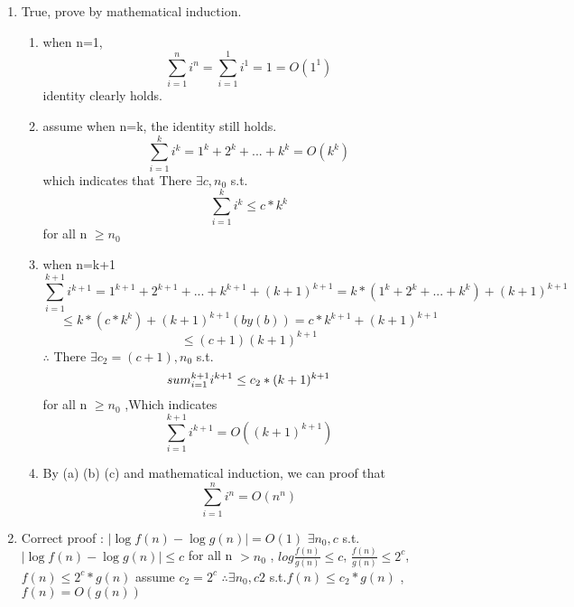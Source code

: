 \documentclass{article}
\begin{document}
\begin{CJK*}{UTF8}{bsmi}
\begin{enumerate}
    \item True, prove by mathematical induction.
        \begin{enumerate}
            \item when n=1, \[ \sum_{i=1}^{n} i^{n} = \sum_{i=1}^{1} i^{1} = 1 = O(1^1) \] identity clearly holds.
            \item assume when n=k, the identity still holds.  \[ \sum_{i=1}^{k} i^{k} = 1^k+2^k +...+k^k = O(k^k) \] which indicates that There $\exists c,n_0$ s.t. \[ \sum_{i=1}^{k} i^{k} \leq c*k^k\] for all n $\geq n_0$ 
            \item when n=k+1 \[ \sum_{i=1}^{k+1} i^{k+1} = 1^{k+1}+2^{k+1} +...+k^{k+1}+ (k+1)^{k+1} = k*(1^k+2^k +...+k^k) + (k+1)^{k+1} \] \[ \leq k*(c*k^k) + (k+1)^{k+1} (by(b)) = c*k^{k+1} + (k+1)^{k+1}\]
            \[\leq (c+1)(k+1)^{k+1}\]
            $\therefore$ There $\exists c_2 = (c+1),n_0$ s.t. \[\\sum_{i=1}^{k+1} i^{k+1} \leq c_2*(k+1)^{k+1} \] for all n $\geq n_0$ ,Which indicates \[ \sum_{i=1}^{k+1} i^{k+1} = O((k+1)^{k+1}) \]
            \item By (a) (b) (c) and mathematical induction, we can proof that \[ \sum_{i=1}^{n} i^{n} = O(n^n) \]
        \end{enumerate}

    \item Correct proof : $\lvert \log{f(n)} - \log{g(n)} \rvert = O(1)$ $ \exists n_0,c $ s.t. $ \lvert \log{f(n)} - \log{g(n)} \rvert \leq c$ for all n $> n_0$ , $log{\frac{f(n)}{g(n)}}\leq c$, $\frac{f(n)}{g(n)}\leq 2^c$, $f(n) \leq 2^c * g(n)$ assume $c_2 = 2^c $ $\therefore \exists n_0,c2$ s.t.$f(n) \leq  c_2 * g(n)$ , $f(n) = O(g(n))$
\end{enumerate}


\end{CJK*}
\end{document}
